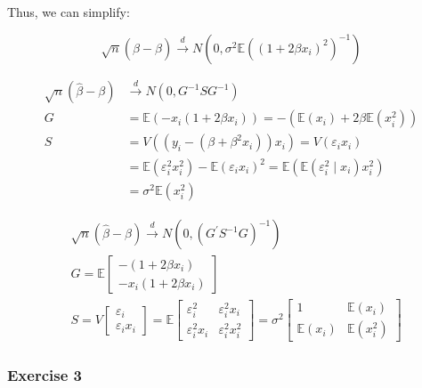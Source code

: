 {{\begin{enumerate}[label=(\arabic*)]
{Thus, we can simplify:

$$
\sqrt{n}(\hat{\beta}-\beta) \xrightarrow{d} N\left(0, \sigma^{2} \mathbb{E}\left(\left(1+2 \beta x_{i}\right)^{2}\right)^{-1}\right)
$$
}
{\item 
$$
\begin{aligned}
\sqrt{n}(\hat{\beta}-\beta) &\xrightarrow{d} N\left(0, G^{-1} S G^{-1}\right) \\
G &= \mathbb{E}\left(-x_{i}\left(1+2 \beta x_{i}\right)\right)=-\left(\mathbb{E}\left(x_{i}\right)+2 \beta \mathbb{E}\left(x_{i}^{2}\right)\right) \\
S &= V\left(\left(y_{i}-\left(\beta+\beta^{2} x_{i}\right)\right) x_{i}\right)=V\left(\varepsilon_{i} x_{i}\right) \\
&= \mathbb{E}\left(\varepsilon_{i}^{2} x_{i}^{2}\right)-\mathbb{E}\left(\varepsilon_{i} x_{i}\right)^{2}=\mathbb{E}\left(\mathbb{E}\left(\varepsilon_{i}^{2} \mid x_{i}\right) x_{i}^{2}\right) \\
&= \sigma^{2} \mathbb{E}\left(x_{i}^{2}\right)
\end{aligned}
$$
}
{\item 
$$
\begin{aligned}
& \sqrt{n}(\hat{\beta}-\beta) \xrightarrow{d} N\left(0, \left(G^{\prime} S^{-1} G\right)^{-1}\right) \\
& G=\mathbb{E}\left[\begin{array}{l}
-\left(1+2 \beta x_{i}\right) \\
-x_{i}\left(1+2 \beta x_{i}\right)
\end{array}\right] \\
& S=V\left[\begin{array}{ll}
\varepsilon_{i} \\
\varepsilon_{i} x_{i}
\end{array}\right]=\mathbb{E}\left[\begin{array}{ll}
\varepsilon_{i}^{2} & \varepsilon_i^{2} x_{i} \\
\varepsilon_{i}^{2} x_{i} & \varepsilon_{i}^{2} x_{i}^{2}
\end{array}\right]=\sigma^{2}\left[\begin{array}{ll}
1 & \mathbb{E}\left(x_{i}\right) \\
\mathbb{E}\left(x_{i}\right) & \mathbb{E}\left(x_{i}^{2}\right)
\end{array}\right]
\end{aligned}
$$
}
\end{enumerate}
}
{
\subsubsection*{Exercise 3}

}}

